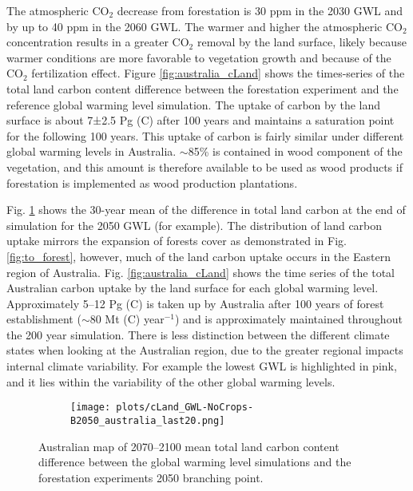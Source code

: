 \documentclass[]{article}
\begin{document}
The atmospheric CO$_2$ decrease from forestation is 30 ppm in the 2030 GWL and by up to 40 ppm in the 2060 GWL.
The warmer and higher the atmospheric CO$_2$ concentration results in a greater CO$_2$ removal by the land surface, likely because warmer conditions are more favorable to vegetation growth and because of the CO$_2$ fertilization effect.
Figure \ref{fig:australia_cLand} shows the times-series of the total land carbon content difference between the forestation experiment and the reference global warming level simulation.
The uptake of carbon by the land surface is about 7±2.5 Pg (C) after 100 years and maintains a saturation point for the following 100 years.
This uptake of carbon is fairly similar under different global warming levels in Australia.
$\sim$85\% is contained in wood component of the vegetation, and this amount is therefore available to be used as wood products if forestation is implemented as wood production plantations.

Fig. \ref{fig:aus_map_cLand} shows the 30-year mean of the difference in total land carbon at the end of simulation for the 2050 GWL (for example).
The distribution of land carbon uptake mirrors the expansion of forests cover as demonstrated in Fig. \ref{fig:to_forest}, however, much of the land carbon uptake occurs in the Eastern region of Australia.
Fig. \ref{fig:australia_cLand} shows the time series of the total Australian carbon uptake by the land surface for each global warming level.
Approximately 5--12 Pg (C) is taken up by Australia after 100 years of forest establishment ($\sim$80 Mt (C) year$^{-1}$) and is approximately maintained throughout the 200 year simulation.
There is less distinction between the different climate states when looking at the Australian region, due to the greater regional impacts internal climate variability.
For example the lowest GWL is highlighted in pink, and it lies within the variability of the other global warming levels.

\begin{figure}[H]
    \centering
    \begin{subfigure}[b]{\linewidth}
        \texttt{[image: plots/cLand\_GWL-NoCrops-B2050\_australia\_last20.png]}
    \end{subfigure}
    \caption{Australian map of 2070--2100 mean total land carbon content difference between the global warming level simulations and the forestation experiments 2050 branching point.}
    \label{fig:aus_map_cLand}
\end{figure}
\end{document}
